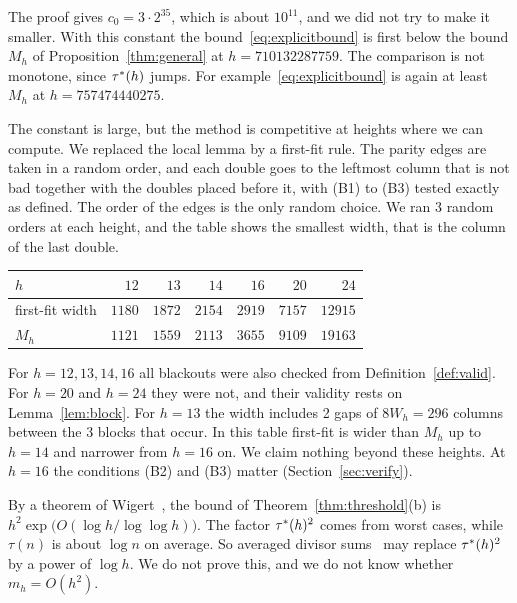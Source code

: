 \begin{remark}\label{rem:constants}
The proof gives $c_0=3\cdot2^{35}$, which is about $10^{11}$, and we did not try to make
it smaller. With this constant the bound~\eqref{eq:explicitbound} is first below the bound
$M_h$ of Proposition~\ref{thm:general} at $h=710132287759$. The comparison is not
monotone, since ${\tau^*}(h)$ jumps. For example~\eqref{eq:explicitbound} is again at least
$M_h$ at $h=757474440275$.

The constant is large, but the method is competitive at heights where we can compute. We
replaced the local lemma by a first-fit rule. The parity edges are taken in a random
order, and each double goes to the leftmost column that is not bad together with the
doubles placed before it, with (B1) to (B3) tested exactly as defined. The order of the
edges is the only random choice. We ran 3 random orders at each height, and the table
shows the smallest width, that is the column of the last double.
\begin{center}
\begin{tabular}{@{}lrrrrrr@{}}
\toprule
$h$ & $12$ & $13$ & $14$ & $16$ & $20$ & $24$\\
\midrule
first-fit width & $1180$ & $1872$ & $2154$ & $2919$ & $7157$ & $12915$\\
$M_h$ & $1121$ & $1559$ & $2113$ & $3655$ & $9109$ & $19163$\\
\bottomrule
\end{tabular}
\end{center}
For $h=12,13,14,16$ all blackouts were also checked from Definition~\ref{def:valid}. For
$h=20$ and $h=24$ they were not, and their validity rests on Lemma~\ref{lem:block}. For
$h=13$ the width includes 2 gaps of $8W_h=296$ columns between the 3 blocks that occur. In
this table first-fit is wider than $M_h$ up to $h=14$ and narrower from $h=16$ on. We claim
nothing beyond these heights. At $h=16$ the conditions (B2) and (B3) matter
(Section~\ref{sec:verify}).
\end{remark}

\begin{remark}\label{rem:sharper}
By a theorem of Wigert~\cite[Theorem~317]{hardywright2008}, the bound of
Theorem~\ref{thm:threshold}(b) is $h^2\exp\bigl(O(\log h/\log\log h)\bigr)$. The factor
${\tau^*}(h)^2$ comes from worst cases, while $\tau(n)$ is about $\log n$ on average. So
averaged divisor sums~\cite{henriot2012} may replace ${\tau^*}(h)^2$ by a power of $\log h$.
We do not prove this, and we do not know whether $m_h=O(h^2)$.
\end{remark}
